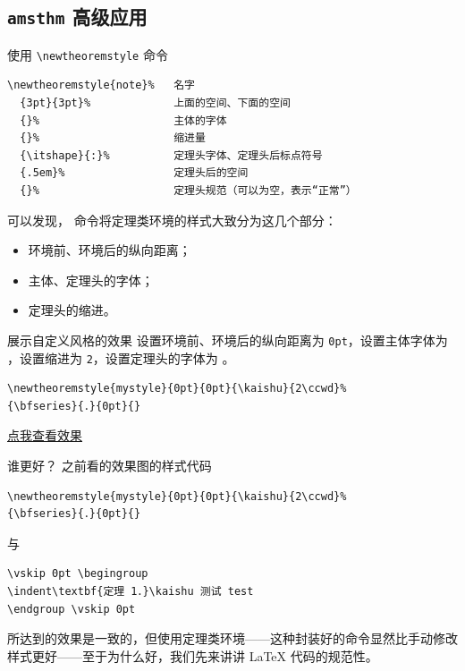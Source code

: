 \documentclass[aspectratio=169,fontset=none]{ctexbeamer}
\newcommand{\pkg}[1]{\texttt{#1}}
\begin{document}
  \subsection{\texorpdfstring{\pkg{amsthm}}{amsthm} 高级应用}
  \begin{frame}[fragile]{使用 \texttt{\textbackslash newtheoremstyle} 命令}
    \begin{verbatim}
\newtheoremstyle{note}%   名字
  {3pt}{3pt}%             上面的空间、下面的空间
  {}%                     主体的字体
  {}%                     缩进量
  {\itshape}{:}%          定理头字体、定理头后标点符号
  {.5em}%                 定理头后的空间
  {}%                     定理头规范（可以为空，表示“正常”）
    \end{verbatim}
    \pause
    可以发现，\texttt{\newtheoremstyle} 命令将定理类环境的样式大致分为这几个部分：
    \begin{itemize}
      \item 环境前、环境后的纵向距离；
      \item 主体、定理头的字体；
      \item 定理头的缩进。
    \end{itemize}
  \end{frame}

  \begin{frame}[fragile]{展示自定义风格的效果}
    设置环境前、环境后的纵向距离为 \texttt{0pt}，设置主体字体为 \texttt{\kaishu}，设置缩进为 \texttt{2\ccwd}，设置定理头的字体为 \texttt{\bfseries}。
    \begin{verbatim}
\newtheoremstyle{mystyle}{0pt}{0pt}{\kaishu}{2\ccwd}%
{\bfseries}{．}{0pt}{}
    \end{verbatim}
    \begin{center}
      \href{material/高级效果.pdf}{点我查看效果}
    \end{center}
  \end{frame}

  \begin{frame}[fragile]{谁更好？}
    之前看的效果图的样式代码
    \begin{verbatim}
\newtheoremstyle{mystyle}{0pt}{0pt}{\kaishu}{2\ccwd}%
{\bfseries}{．}{0pt}{}
    \end{verbatim}
    与
    \begin{verbatim}
\vskip 0pt \begingroup
\indent\textbf{定理 1．}\kaishu 测试 test
\endgroup \vskip 0pt
    \end{verbatim}
    所达到的效果是一致的，但使用定理类环境——这种封装好的命令显然比手动修改样式更好——至于为什么好，我们先来讲讲 \LaTeX{} 代码的规范性。
  \end{frame}
\end{document}
